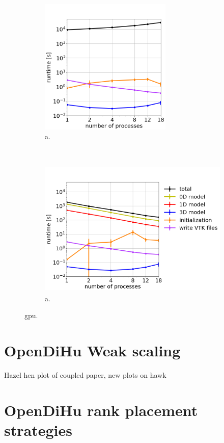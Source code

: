 \begin{figure}%
  \centering%
  \begin{subfigure}[t]{0.48\textwidth}%
    \centering%
    \includegraphics[height=6.5cm]{images/results/studies/16_hodgkin_huxley_gpu.png}%
    \caption{a.}%
    \label{fig:16_hodgkin_huxley_gpu}%
  \end{subfigure}
  \,
  \begin{subfigure}[t]{0.48\textwidth}%
    \centering%
    \includegraphics[height=6.5cm]{images/results/studies/16_hodgkin_huxley_cpu.png}%
    \caption{a.}%
    \label{fig:16_hodgkin_huxley_cpu}%
  \end{subfigure}   
  \caption{gpu.}%
  \label{fig:16_hodgkin_huxley_cpu_gpu}%
\end{figure}%

\section{OpenDiHu Weak scaling}
Hazel hen plot of coupled paper, new plots on hawk
\section{OpenDiHu rank placement strategies}

